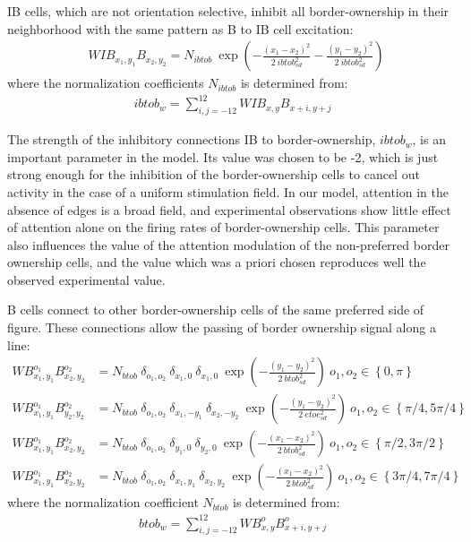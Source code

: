 IB cells, which are not orientation selective, inhibit all border-ownership in their neighborhood with the same pattern as B to IB cell excitation:
\begin{align}
	&WIB_{x_1,y_1}B_{x_2,y_2}=N_{ibtob}\: \exp\left(-\frac{(x_1-x_2)^2}{2\: ibtob_{sd}^2}-\frac{(y_1-y_2)^2}{2\: ibtob_{sd}^2}\right)\
\end{align}
where the normalization coefficients $N_{ibtob}$ is determined from:
\begin{align}
	ibtob_w = \sum^{12}_{i,j=-12} WIB_{x,y}B_{x+i,y+j}
\end{align}

The strength of the inhibitory connections IB to border-ownership, $ibtob_w$, is an important parameter in the
model. Its value was chosen to be -2, which is just strong enough for
the inhibition of the border-ownership cells to 
cancel out activity
in the case of a uniform stimulation field. In our model, attention in the absence of edges is a broad field, and experimental observations show little effect of attention alone on the firing rates of border-ownership cells. This parameter also influences the value of the attention modulation of the non-preferred border ownership cells, and the value which was a
priori chosen reproduces well the observed experimental value.

B cells connect to other border-ownership cells of the same preferred
side of figure. These connections allow the passing of border
ownership signal along a line: 
\begin{align}
	WB^{o_1}_{x_1,y_1}B^{o_2}_{x_2,y_2}&=N_{btob}\: \delta_{o_1,o_2}\: \delta_{x_1,0}\: \delta_{x_1,0}\: 
	\exp\left(-\frac{(y_1-y_2)^2}{2\: btob_{sd} ^2}\right)\  o_1,o_2\in \left\{0,\pi\right\}\nonumber\\
	WB^{o_1}_{x_1,y_1}B^{o_2}_{y_2,y_2}&=N_{btob}\: \delta_{o_1,o_2}\: \delta_{x_1,-y_1}\: \delta_{x_2,-y_2}\:
	\exp\left(-\frac{(y_1-y_2)^2}{2\: etoe_{sd} ^2}\right)\  o_1,o_2\in \left\{\pi/4,5\pi/4 \right\}\nonumber\\
	WB^{o_1}_{x_1,y_1}B^{o_2}_{x_2,y_2}&=N_{btob}\: \delta_{o_1,o_2}\: \delta_{y_1,0}\: \delta_{y_2,0}\: 
	\exp\left(-\frac{(x_1-x_2)^2}{2\: btob_{sd} ^2}\right)\ o_1,o_2\in \left\{\pi/2,3\pi/2 \right\}\nonumber\\
	WB^{o_1}_{x_1,y_1}B^{o_2}_{x_2,y_2}&=N_{btob}\: \delta_{o_1,o_2}\: \delta_{x_1,y_1}\: \delta_{x_2,y_2}\: 
	\exp\left(-\frac{(x_1-x_2)^2}{2\: btob_{sd} ^2}\right)\  o_1,o_2\in \left\{3\pi/4,7\pi/4 \right\}	
\end{align}
where the normalization coefficient $N_{btob}$ is determined from:
\begin{align}
	btob_w = \sum^{12}_{i,j=-12} WB^{o}_{x,y}B^{o}_{x+i,y+j}
\end{align}

